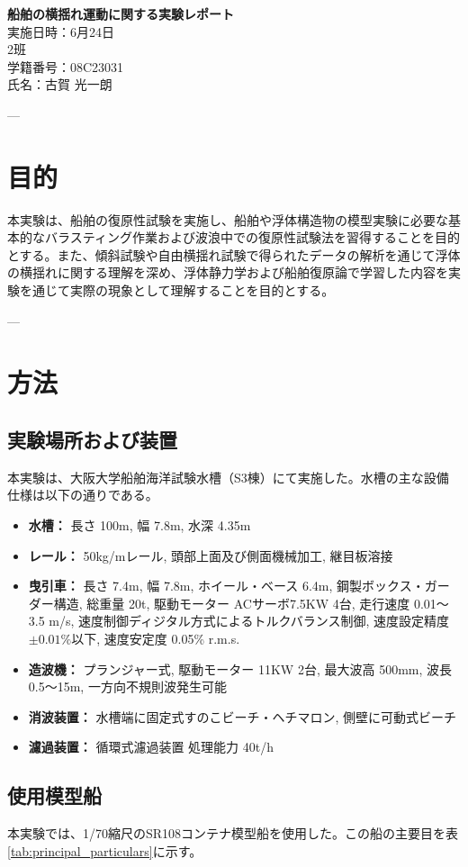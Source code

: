 \documentclass[dvipdfmx,a4paper]{jreport} %
\def\titlepage{%
  \thispagestyle{empty}%
  \begin{center}%
    \vspace*{\fill}%
    {\huge \bfseries 船舶の横揺れ運動に関する実験レポート \\}%
    \vspace{2cm}%
    {\large 実施日時：6月24日\\}%
    \vspace{1cm}%
    {\large 2班 \\}%
    \vspace{1cm}%
    {\large 学籍番号：08C23031\\}%
    \vspace{1cm}%
    {\large 氏名：古賀 光一朗 \\}%
    \vspace*{\fill}%
  \end{center}%
}
\begin{document}
\titlepage

---

\chapter{目的}
本実験は、船舶の復原性試験を実施し、船舶や浮体構造物の模型実験に必要な基本的なバラスティング作業および波浪中での復原性試験法を習得することを目的とする。また、傾斜試験や自由横揺れ試験で得られたデータの解析を通じて浮体の横揺れに関する理解を深め、浮体静力学および船舶復原論で学習した内容を実験を通じて実際の現象として理解することを目的とする。

---

\chapter{方法}
\section{実験場所および装置}
本実験は、大阪大学船舶海洋試験水槽（S3棟）にて実施した。水槽の主な設備仕様は以下の通りである。

\begin{itemize}
    \item \textbf{水槽：} 長さ 100m, 幅 7.8m, 水深 4.35m
    \item \textbf{レール：} 50kg/mレール, 頭部上面及び側面機械加工, 継目板溶接
    \item \textbf{曳引車：} 長さ 7.4m, 幅 7.8m, ホイール・ベース 6.4m, 鋼製ボックス・ガーダー構造, 総重量 20t, 駆動モーター ACサーボ7.5KW 4台, 走行速度 0.01～3.5 m/s, 速度制御ディジタル方式によるトルクバランス制御, 速度設定精度 $\pm 0.01\%$以下, 速度安定度 0.05\% r.m.s.
    \item \textbf{造波機：} プランジャー式, 駆動モーター 11KW 2台, 最大波高 500mm, 波長 0.5～15m, 一方向不規則波発生可能
    \item \textbf{消波装置：} 水槽端に固定式すのこビーチ・ヘチマロン, 側壁に可動式ビーチ
    \item \textbf{濾過装置：} 循環式濾過装置 処理能力 40t/h
\end{itemize}

\section{使用模型船}
本実験では、1/70縮尺のSR108コンテナ模型船を使用した。この船の主要目を表\ref{tab:principal_particulars}に示す。
\end{document}
